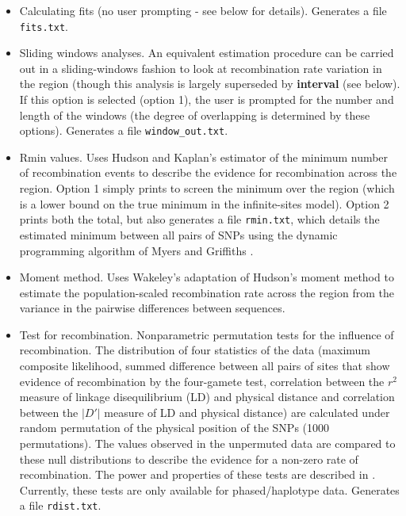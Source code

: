 \documentclass[a4paper,10pt,fullpage]{article}
\begin{document}
\begin{itemize}
\item Calculating fits (no user prompting - see below for
details).  Generates a file {\verb+fits.txt+}.

\item Sliding windows analyses.  An equivalent estimation
procedure can be carried out in a sliding-windows fashion to look
at recombination rate variation in the region (though this
analysis is largely superseded by {\bf interval} (see below).  If
this option is selected (option 1), the user is prompted for the
number and length of the windows (the degree of overlapping is
determined by these options).  Generates a file {\verb+window_out.txt+}.

\item Rmin values.  Uses Hudson and Kaplan's estimator of the
minimum number of recombination events \cite{HudsonKaplan85} to
describe the evidence for recombination across the region.  Option
1 simply prints to screen the minimum over the region (which is a
lower bound on the true minimum in the infinite-sites model).
Option 2 prints both the total, but also generates a file {\verb+rmin.txt+}, which details the estimated minimum between all pairs
of SNPs using the dynamic programming algorithm of Myers and
Griffiths \cite{MyersGriffiths03}.

\item Moment method.  Uses Wakeley's \cite{Wakeley97} adaptation
of Hudson's \cite{Hudson87} moment method to estimate the
population-scaled recombination rate across the region from the
variance in the pairwise differences between sequences.

\item Test for recombination.  Nonparametric permutation tests for
the influence of recombination.  The distribution of four
statistics of the data (maximum composite likelihood, summed
difference between all pairs of sites that show evidence of
recombination by the four-gamete test, correlation between the
$r^2$ measure of linkage disequilibrium (LD) and physical distance
and correlation between the $|D'|$ measure of LD and physical
distance) are calculated under random permutation of the physical
position of the SNPs (1000 permutations).  The values observed in
the unpermuted data are compared to these null distributions to
describe the evidence for a non-zero rate of recombination.  The
power and properties of these tests are described in
\cite{McVeanetal02}.  Currently, these tests are only available
for phased/haplotype data.  Generates a file {\verb+rdist.txt+}.


\end{itemize}
\end{document}

